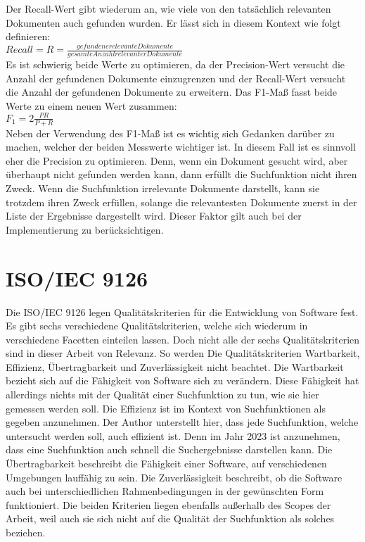 Der Recall-Wert gibt wiederum an, wie viele von den tatsächlich relevanten Dokumenten auch gefunden wurden.
Er lässt sich in diesem Kontext wie folgt definieren\cite{Sirotkin_2012}:\\

\(Recall=R=\frac{gefundene relevante Dokumente}{gesamte Anzahl relevanter Dokumente}\)\\

Es ist schwierig beide Werte zu optimieren, da der Precision-Wert versucht die Anzahl der gefundenen Dokumente einzugrenzen und der Recall-Wert versucht die Anzahl der gefundenen Dokumente zu erweitern.
Das F1-Maß fasst beide Werte zu einem neuen Wert zusammen\cite{Sirotkin_2012}:\\

\(F_1=2\frac{PR}{P+R}\)\\

Neben der Verwendung des F1-Maß ist es wichtig sich Gedanken darüber zu machen, welcher der beiden Messwerte wichtiger ist.
In diesem Fall ist es sinnvoll eher die Precision zu optimieren.
Denn, wenn ein Dokument gesucht wird, aber überhaupt nicht gefunden werden kann, dann erfüllt die Suchfunktion nicht ihren Zweck.
Wenn die Suchfunktion irrelevante Dokumente darstellt, kann sie trotzdem ihren Zweck erfüllen, solange die relevantesten Dokumente zuerst in der Liste der Ergebnisse dargestellt wird.
Dieser Faktor gilt auch bei der Implementierung zu berücksichtigen.

\section{ISO/IEC 9126}
Die ISO/IEC 9126 legen Qualitätskriterien für die Entwicklung von Software fest.
Es gibt sechs verschiedene Qualitätskriterien, welche sich wiederum in verschiedene Facetten einteilen lassen.
Doch nicht alle der sechs Qualitätskriterien sind in dieser Arbeit von Relevanz.
So werden Die Qualitätskriterien Wartbarkeit, Effizienz, Übertragbarkeit und Zuverlässigkeit nicht beachtet.
Die Wartbarkeit bezieht sich auf die Fähigkeit von Software sich zu verändern.
Diese Fähigkeit hat allerdings nichts mit der Qualität einer Suchfunktion zu tun, wie sie hier gemessen werden soll.
Die Effizienz ist im Kontext von Suchfunktionen als gegeben anzunehmen.
Der Author unterstellt hier, dass jede Suchfunktion, welche untersucht werden soll, auch effizient ist.
Denn im Jahr 2023 ist anzunehmen, dass eine Suchfunktion auch schnell die Suchergebnisse darstellen kann.
Die Übertragbarkeit beschreibt die Fähigkeit einer Software, auf verschiedenen Umgebungen lauffähig zu sein.
Die Zuverlässigkeit beschreibt, ob die Software auch bei unterschiedlichen Rahmenbedingungen in der gewünschten Form funktioniert.
Die beiden Kriterien liegen ebenfalls außerhalb des Scopes der Arbeit, weil auch sie sich nicht auf die Qualität der Suchfunktion als solches beziehen.\\

